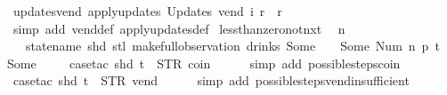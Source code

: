 \begin{isabellebody}
\endisatagproof
{\isafoldproof}%
%
\isadelimproof
\isanewline
%
\endisadelimproof
\isanewline
{}\isamarkupfalse%
\ updates{\isacharunderscore}vend{\isacharcolon}\ {\isachardoublequoteopen}apply{\isacharunderscore}updates\ {\isacharparenleft}Updates\ vend{\isacharparenright}\ i\ r\ {\isacharequal}\ r{\isachardoublequoteclose}\isanewline
%
\isadelimproof
\ \ %
\endisadelimproof
%
\isatagproof
{}\isamarkupfalse%
\ {\isacharparenleft}simp\ add{\isacharcolon}\ vend{\isacharunderscore}def\ apply{\isacharunderscore}updates{\isacharunderscore}def{\isacharparenright}%
\endisatagproof
{\isafoldproof}%
%
\isadelimproof
\isanewline
%
\endisadelimproof
\isanewline
{}\isamarkupfalse%
\ less{\isacharunderscore}than{\isacharunderscore}zero{\isacharunderscore}not{\isacharunderscore}nxt{\isacharunderscore}{}{\isacharcolon}\isanewline
\ \ {\isachardoublequoteopen}n\ {\isasymle}\ {}\ {\isasymLongrightarrow}\isanewline
\ \ \ statename\ {\isacharparenleft}shd\ {\isacharparenleft}stl\ {\isacharparenleft}make{\isacharunderscore}full{\isacharunderscore}observation\ drinks\ {\isacharparenleft}Some\ {}{\isacharparenright}\ {\isacharless}{}\ {\isachardollar}{\isacharcolon}{\isacharequal}\ Some\ {\isacharparenleft}Num\ n{\isacharparenright}{\isachargreater}\ p\ t{\isacharparenright}{\isacharparenright}{\isacharparenright}\ {\isasymnoteq}\ Some\ {}{\isachardoublequoteclose}\isanewline
%
\isadelimproof
\ \ %
\endisadelimproof
%
\isatagproof
{}\isamarkupfalse%
\ {\isacharparenleft}case{\isacharunderscore}tac\ {\isachardoublequoteopen}shd\ t\ {\isacharequal}\ {\isacharparenleft}STR\ {\isacharprime}{\isacharprime}coin{\isacharprime}{\isacharprime}{\isacharcomma}\ {\isacharbrackleft}{\isacharbrackright}{\isacharparenright}{\isachardoublequoteclose}{\isacharparenright}\isanewline
\ \ \ \isamarkupfalse%
\ {\isacharparenleft}simp\ add{\isacharcolon}\ possible{\isacharunderscore}steps{\isacharunderscore}coin{\isacharparenright}\isanewline
\ \ \isamarkupfalse%
\ {\isacharparenleft}case{\isacharunderscore}tac\ {\isachardoublequoteopen}shd\ t\ {\isacharequal}\ {\isacharparenleft}STR\ {\isacharprime}{\isacharprime}vend{\isacharprime}{\isacharprime}{\isacharcomma}\ {\isacharbrackleft}{\isacharbrackright}{\isacharparenright}{\isachardoublequoteclose}{\isacharparenright}\isanewline
\ \ \ \isamarkupfalse%
\ {\isacharparenleft}simp\ add{\isacharcolon}\ possible{\isacharunderscore}steps{\isacharunderscore}vend{\isacharunderscore}insufficient{\isacharparenright}\isanewline

\end{isabellebody}
